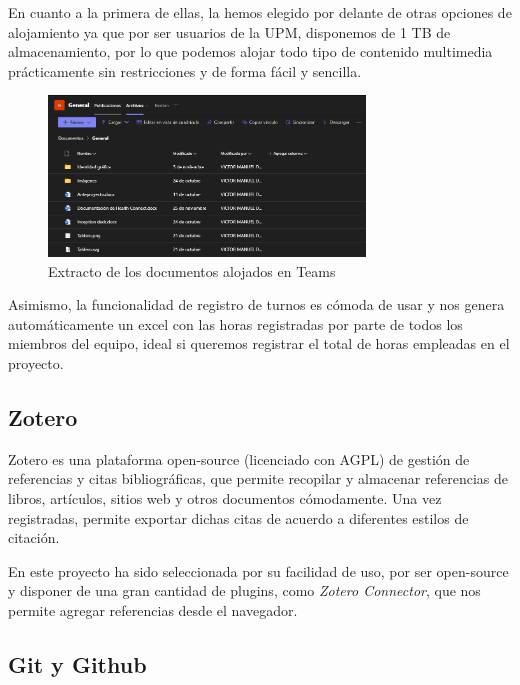             En cuanto a la primera de ellas, la hemos elegido por delante de otras opciones de alojamiento ya que por ser usuarios de la UPM, disponemos de 1 TB de almacenamiento, por lo que podemos alojar todo tipo de contenido multimedia prácticamente sin restricciones y de forma fácil y sencilla.
            
            \begin{figure}[h!]
                \centering
                \includegraphics[width=0.75\textwidth]{figures/s0/archivos teams.PNG}
                \caption{Extracto de los documentos alojados en Teams}
                \label{fig:teams:documentos}
            \end{figure}
            
            Asimismo, la funcionalidad de registro de turnos es cómoda de usar y nos genera automáticamente un excel con las horas registradas por parte de todos los miembros del equipo, ideal si queremos registrar el total de horas empleadas en el proyecto.
            
        
        \subsection{Zotero}
            Zotero es una plataforma open-source (licenciado con AGPL) de gestión de referencias y citas bibliográficas, que permite recopilar y almacenar referencias de libros, artículos, sitios web y otros documentos cómodamente. Una vez registradas, permite exportar dichas citas de acuerdo a diferentes estilos de citación.
            
            En este proyecto ha sido seleccionada por su facilidad de uso, por ser open-source y disponer de una gran cantidad de plugins, como \textit{Zotero Connector}, que nos permite agregar referencias desde el navegador.
            
        
        \subsection{Git y Github}
        
